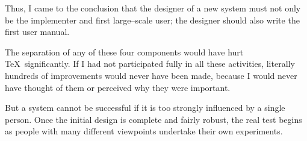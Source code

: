 Thus, I came to the conclusion that the designer of a new
system must not only be the implementer and first
large--scale user; the designer should also write the first
user manual.

The separation of any of these four components would have
hurt \TeX\ significantly. If I had not participated fully in
all these activities, literally hundreds of improvements
would never have been made, because I would never have
thought of them or perceived why they were important.

But a system cannot be successful if it is too strongly
influenced by a single person. Once the initial design is
complete and fairly robust, the real test begins as people
with many different viewpoints undertake their own
experiments.
